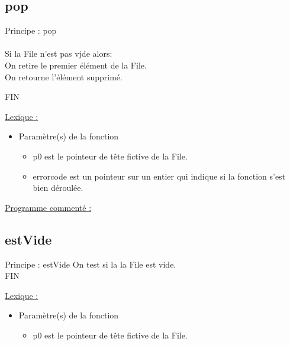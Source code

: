 \documentclass[a4paper]{article}
\newcommand\tab[1][1cm]{\hspace*{#1}}
\begin{document}
\subsection{pop}

\begin{algorithm}

Principe : pop
\\
\\
\tab Si la File n'est pas vjde alors:
\\
\tab \tab On retire le premier élément de la File.
\\
\tab On retourne l'élément supprimé.

FIN

\end{algorithm}


\underline{Lexique :}

\begin{itemize}

\item Paramètre(s) de la fonction  

\begin{itemize}

\item p0 est le pointeur de tête fictive de la File.

\item errorcode est un pointeur sur un entier qui indique si la fonction s'est bien déroulée.


\end{itemize}
\end{itemize}
\underline{Programme commenté :}
\subsection{estVide}

\begin{algorithm}

Principe : estVide
\tab On test si la la File est vide. 
\\



FIN
\end{algorithm}


\underline{Lexique :}

\begin{itemize}

\item Paramètre(s) de la fonction  

\begin{itemize}

\item p0 est le pointeur de tête fictive de la File.

\end{itemize}

\end{itemize}
\end{document}
